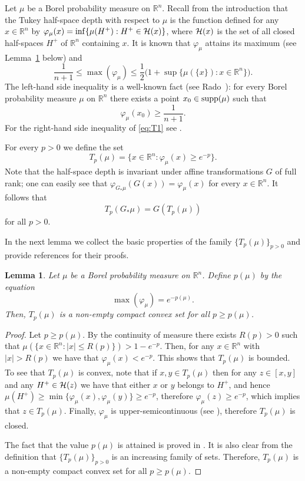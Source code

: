 \documentclass[11pt,leqno]{article}
\newtheorem{lemma}[theorem]{Lemma}
\theoremstyle{definition}
\theoremstyle{remark}
\numberwithin{equation}{section}
\newcommand{\ls}{\leqslant}
\newcommand{\gr}{\geqslant}
\newcommand{\1}{\textbf{1}}
\begin{document}
Let $\mu $ be a Borel probability measure on ${\mathbb R}^n$. Recall from the introduction that the Tukey half-space
depth with respect to $\mu$ is the function defined for any $x\in {\mathbb R}^n$ by
$\varphi_{\mu }(x)=\inf\{\mu (H^+):H^+\in {\cal H}(x)\}$,
where ${\cal H}(x)$ is the set of all closed half-spaces $H^+$ of ${\mathbb R}^n$ containing $x$.
It is known that $\varphi_{\mu}$ attains its maximum (see Lemma~\ref{lem:T} below) and
\begin{equation}\label{eq:T1}\frac{1}{n+1}\ls \max(\varphi_{\mu})\ls \frac{1}{2}\big(1+\sup\{\mu(\{x\}):x\in\mathbb{R}^n\}\big).\end{equation}
The left-hand side inequality is a well-known fact (see Rado~\cite{Rado}):
for every Borel probability measure $\mu$ on $\mathbb{R}^n$ there exists a point $x_0\in {\rm supp}(\mu)$ such that
$$\varphi_{\mu}(x_0)\gr \frac{1}{n+1}.$$
For the right-hand side inequality of \eqref{eq:T1}  see \cite[Lemma~1]{RR-1999}.

For every $p>0$ we define the set
$$T_p(\mu)=\{x\in \mathbb{R}^n:\varphi_{\mu}(x)\gr e^{-p}\}.$$
Note that the half-space depth is invariant under affine transformations $G$ of full rank; one can easily see that
$\varphi_{G_{\ast}\mu}(G(x))=\varphi_{\mu}(x)$ for every $x\in\mathbb{R}^n$. It follows that
$$T_p(G_{\ast}\mu)=G(T_p(\mu))$$
for all $p>0$.

In the next lemma we collect the basic properties of the family $\{T_p(\mu)\}_{p>0}$ and provide references
for their proofs.

\begin{lemma}\label{lem:T}Let $\mu $ be a Borel probability measure on ${\mathbb R}^n$. Define $p(\mu)$
by the equation
\begin{equation}\label{eq:def-pmu}\max(\varphi_{\mu})=e^{-p(\mu)}.\end{equation}
Then, $T_p(\mu)$ is a non-empty compact convex set for all $p\gr p(\mu)$.
\end{lemma}

\begin{proof}Let $p\gr p(\mu)$. By the continuity of measure there exists $R(p)>0$ such that
$\mu(\{x\in\mathbb{R}^n:|x|\ls R(p)\})>1-e^{-p}$. Then, for any $x\in\mathbb{R}^n$
with $|x|>R(p)$ we have that $\varphi_{\mu}(x)<e^{-p}$. This shows
that $T_p(\mu)$ is bounded. To see that $T_p(\mu)$ is convex, note that if $x,y\in T_p(\mu)$ then for
any $z\in [x,y]$ and any $H^+\in {\cal H}(z)$ we have that either $x$ or $y$ belongs to $H^+$, and hence $\mu(H^+)\gr \min\{\varphi_{\mu}(x),\varphi_{\mu}(y)\}\gr e^{-p}$, therefore $\varphi_{\mu}(z)\gr e^{-p}$, which implies that $z\in T_p(\mu)$.
Finally, $\varphi_{\mu}$ is upper-semicontinuous (see \cite[Lemma~6.1]{Donoho-Gasko-1992}), therefore
$T_p(\mu)$ is closed.

The fact that the value $p(\mu)$ is attained is proved in \cite[Proposition~7]{RR-1999}. It is also
clear from the definition that $\{T_p(\mu)\}_{p>0}$ is an increasing family of sets. Therefore, $T_p(\mu)$
is a non-empty compact convex set for all $p\gr p(\mu)$.
\end{proof}
\end{document}
